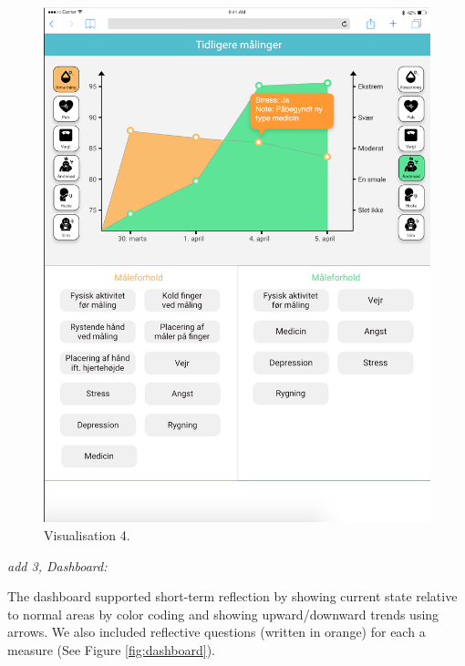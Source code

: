 \begin{figure}[h]
\begin{minipage}[b]{0.45\textwidth}
    \includegraphics[width=\textwidth]{images/study2/v4.png}
    \caption{Visualisation 4.}
    \label{fig:v4}
  \end{minipage}
\end{figure}

\FloatBarrier

\textit{add 3, Dashboard:}

The dashboard supported short-term reflection by showing current state relative to normal areas by color coding and showing upward/downward trends using arrows. We also included reflective questions (written in orange) for each a measure (See Figure \ref{fig:dashboard}).

